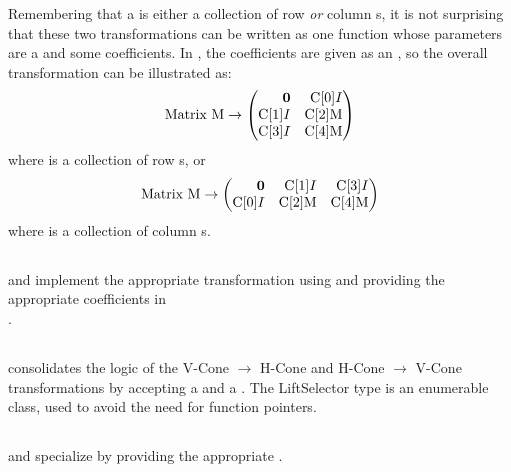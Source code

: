 Remembering that a  is either a collection of row \textit{or} column s, it is not surprising that these two transformations can be written as one function whose parameters are a  and some coefficients.  In , the coefficients are given as an , so the overall transformation can be illustrated as:
\newcommand{\CA}[1]{\mli{C[#1]}}
\[ \mli{Matrix M} \to
	\begin{pmatrix*}[r]
		\0 & \CA{0}I \\
		\CA{1}I & \CA{2}\mli{M} \\
		\CA{3}I & \CA{4}\mli{M}
	\end{pmatrix*} \]
where  is a collection of row s, or
\[ \mli{Matrix M} \to
	\begin{pmatrix*}[r]
		\0 & \CA{1}I & \CA{3}I \\
		\CA{0}I & \CA{2}\mli{M} & \CA{4}\mli{M}
	\end{pmatrix*} \]
where  is a collection of column s.
\lstgeneralizedlift

\subsection{}
 and  implement the appropriate transformation using  and providing the appropriate coefficients in \\
.
\lstliftvcone
\lstlifthcone

\subsection{}
 consolidates the logic of the V-Cone $\to$ H-Cone and H-Cone $\to$ V-Cone transformations by accepting a  and a .  The LiftSelector type is an enumerable class, used to avoid the need for function pointers.
\lstconetransform

\subsection{}
 and  specialize  by providing the appropriate .
\lstvconetohcone
\lsthconetovcone

